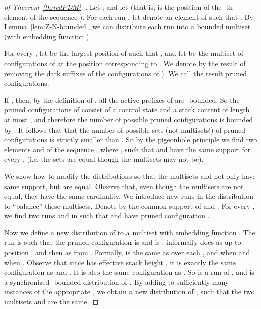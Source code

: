 \documentclass{llncs}
\begin{document}
\begin{definition}
\begin{proof}[of Theorem~\ref{th:redPDM}]
   \medskip
   
  . Let , and let   (that is,  is the position of the -th element of the sequence ). For each run , let  denote an element of
   such that . By  Lemma~\ref{lem:Z-N-bounded}, we can distribute each run
   into a bounded multiset  (with embedding function ).

  For every , let  be the largest position of  such that , and let  be  the multiset of configurations of  at the
  position corresponding to . We denote by
   the result of removing the dark suffixes of the configurations of 
  ). We call the result pruned configurations. 
  
  If , then, by the definition of
  , all the active prefixes of  are
  -bounded. So the pruned configurations of  consist
  of a control state and a stack content of length at most , and therefore the number of possible pruned 
  configurations is bounded by . It follows that 
  that the number of possible sets (not multisets!) of pruned configurations is strictly smaller than . 
  So by the pigeonhole principle we find two elements  and 
  of the sequence , where , such that 
   and  have
  the same support for every , (i.e. the sets are equal though the multisets may not
  be). 

\medskip

  We show how to modify the distributions  so that
  the multisets  and  not only have same support, but are 
  equal.  Observe that, even though the multisets are not equal, they have
  the same cardinality. We introduce new runs in the distribution to ``balance'' these multisets. 
  Denote by  the common support of  and .
  For every , we find two runs  and  in
   such that  and  have pruned configuration .

  Now we define a new distribution of  to a multiset  with embedding function . 
  The run  is
  such that the pruned configuration  is  and
   is  : informally
   does as  up to position , and then as  from .
  Formally,  is the same as  over each
  , and  when  and
   when . Observe that since  has
  effective stack height , it is exactly the same configuration as
   and .
  It is also the same configuration as . So
   is a run of , and  is a synchronized
  -bounded distribution of .
  By adding to  sufficiently many instances of the appropriate
  , we obtain a new distribution  of ,
  such that the two multisets  and
   are the same.



\end{proof}
\end{definition}
\end{document}
